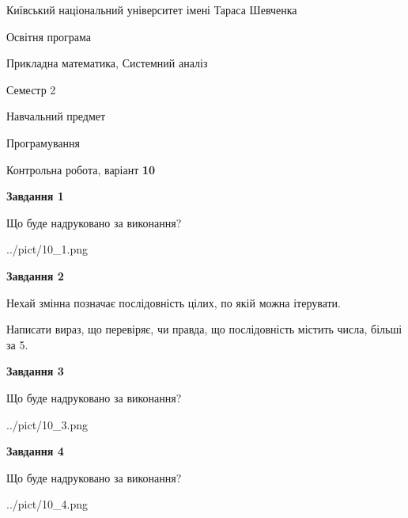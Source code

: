 \documentclass[12pt, ukrainian]{article}
\begin{document}
{{\begin {small}\par
{ \center  Київський національний університет імені Тараса Шевченка \par}
{\parbox {5 cm}{Освітня програма \hfill}{\parbox {8 cm}{Прикладна математика, Системний аналіз \hfill}}\parbox {5 cm}{\hfill Семестр 2}}\par
{\parbox {5 cm} {Навчальний предмет \hfill}\parbox {7 cm}{Програмування \hfill}\parbox {6cm}{\hfill}\par}\vspace{-7pt} \end{small}}{\center Контрольна робота, варіант  \No \textbf
{ 10 }\par}}
{
\begin {large}
{\begin {center}\textbf{Завдання 1}\end {center}}\par
Що буде надруковано за виконання?\par\par
\begin{center}
	{../pict/10_1.png}
\end{center}
\newpage

{\begin {center}\textbf{Завдання 2}\end {center}}\par
Нехай змінна  позначає послідовність цілих, по якій можна ітерувати.

Написати вираз, що перевіряє, чи правда, що послідовність  містить числа, більші за 5.\par
\newpage

{\begin {center}\textbf{Завдання 3}\end {center}}\par
Що буде надруковано за виконання?\par
\begin{center}
	{../pict/10_3.png}
\end{center}
\newpage

{\begin {center}\textbf{Завдання 4}\end {center}}\par
Що буде надруковано за виконання?\par
\begin{center}
	{../pict/10_4.png}
\end{center}
\newpage


\end{large}}
\end{document}
